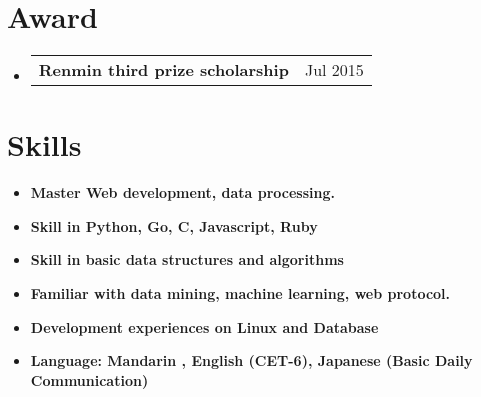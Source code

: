 \documentclass[UTF8,11pt]{article}
\makeatletter
\newcommand{\resumeItem}[2]{
  \item\small{
    \textbf{#1}{ #2 \vspace{-2pt}}
  }
}
\newcommand{\resumeSubSecheading}[2]{
  \vspace{0pt}\item
    \begin{tabular*}{0.97\textwidth}{l@{\extracolsep{\fill}}r}
      \textbf{#1} & #2 \\
    \end{tabular*}\vspace{-7pt}
}
\newcommand{\resumeSubItem}[2]{\resumeItem{#1}{#2}\vspace{-4pt}}
\newcommand{\resumeSubHeadingListStart}{\begin{itemize}[leftmargin=*]}
\newcommand{\resumeSubHeadingListEnd}{\end{itemize}}\vspace{-12pt}}
\makeatother
\begin{document}
\section{Award}
  \resumeSubHeadingListStart
    \resumeSubSecheading
      { Renmin third prize scholarship}{Jul 2015}
  \resumeSubHeadingListEnd
%
\section{Skills}
  \resumeSubHeadingListStart
    \resumeSubItem{Master Web development, data processing.}
      {}
    \resumeSubItem{Skill in Python, Go, C, Javascript, Ruby}
      {}
    \resumeSubItem{Skill in basic data structures and algorithms}
      {}
    \resumeSubItem{Familiar with data mining, machine learning, web protocol.}
      {}
    \resumeSubItem{Development experiences on Linux and Database}
      {}
    \resumeSubItem{Language: Mandarin , English (CET-6), Japanese (Basic Daily Communication)}
      {}
  \resumeSubHeadingListEnd


\end{document}
